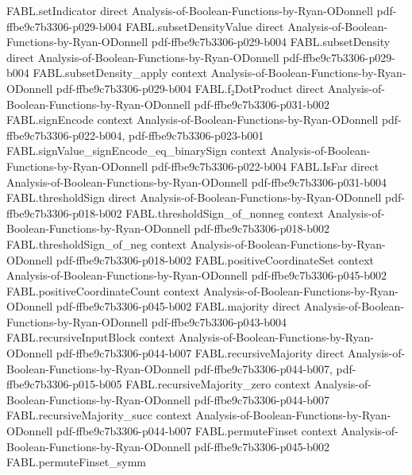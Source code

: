 \begin{theorem}
\proofstep
  {FABL.setIndicator}
  {direct}
  {Analysis-of-Boolean-Functions-by-Ryan-ODonnell}
  {pdf-ffbe9c7b3306-p029-b004}
\proofstep
  {FABL.subsetDensityValue}
  {direct}
  {Analysis-of-Boolean-Functions-by-Ryan-ODonnell}
  {pdf-ffbe9c7b3306-p029-b004}
\proofstep
  {FABL.subsetDensity}
  {direct}
  {Analysis-of-Boolean-Functions-by-Ryan-ODonnell}
  {pdf-ffbe9c7b3306-p029-b004}
\proofstep
  {FABL.subsetDensity_apply}
  {context}
  {Analysis-of-Boolean-Functions-by-Ryan-ODonnell}
  {pdf-ffbe9c7b3306-p029-b004}
\proofstep
  {FABL.f₂DotProduct}
  {direct}
  {Analysis-of-Boolean-Functions-by-Ryan-ODonnell}
  {pdf-ffbe9c7b3306-p031-b002}
\proofstep
  {FABL.signEncode}
  {context}
  {Analysis-of-Boolean-Functions-by-Ryan-ODonnell}
  {pdf-ffbe9c7b3306-p022-b004,
    pdf-ffbe9c7b3306-p023-b001}
\proofstep
  {FABL.signValue_signEncode_eq_binarySign}
  {context}
  {Analysis-of-Boolean-Functions-by-Ryan-ODonnell}
  {pdf-ffbe9c7b3306-p022-b004}
\proofstep
  {FABL.IsFar}
  {direct}
  {Analysis-of-Boolean-Functions-by-Ryan-ODonnell}
  {pdf-ffbe9c7b3306-p031-b004}
\proofstep
  {FABL.thresholdSign}
  {direct}
  {Analysis-of-Boolean-Functions-by-Ryan-ODonnell}
  {pdf-ffbe9c7b3306-p018-b002}
\proofstep
  {FABL.thresholdSign_of_nonneg}
  {context}
  {Analysis-of-Boolean-Functions-by-Ryan-ODonnell}
  {pdf-ffbe9c7b3306-p018-b002}
\proofstep
  {FABL.thresholdSign_of_neg}
  {context}
  {Analysis-of-Boolean-Functions-by-Ryan-ODonnell}
  {pdf-ffbe9c7b3306-p018-b002}
\proofstep
  {FABL.positiveCoordinateSet}
  {context}
  {Analysis-of-Boolean-Functions-by-Ryan-ODonnell}
  {pdf-ffbe9c7b3306-p045-b002}
\proofstep
  {FABL.positiveCoordinateCount}
  {context}
  {Analysis-of-Boolean-Functions-by-Ryan-ODonnell}
  {pdf-ffbe9c7b3306-p045-b002}
\proofstep
  {FABL.majority}
  {direct}
  {Analysis-of-Boolean-Functions-by-Ryan-ODonnell}
  {pdf-ffbe9c7b3306-p043-b004}
\proofstep
  {FABL.recursiveInputBlock}
  {context}
  {Analysis-of-Boolean-Functions-by-Ryan-ODonnell}
  {pdf-ffbe9c7b3306-p044-b007}
\proofstep
  {FABL.recursiveMajority}
  {direct}
  {Analysis-of-Boolean-Functions-by-Ryan-ODonnell}
  {pdf-ffbe9c7b3306-p044-b007,
    pdf-ffbe9c7b3306-p015-b005}
\proofstep
  {FABL.recursiveMajority_zero}
  {context}
  {Analysis-of-Boolean-Functions-by-Ryan-ODonnell}
  {pdf-ffbe9c7b3306-p044-b007}
\proofstep
  {FABL.recursiveMajority_succ}
  {context}
  {Analysis-of-Boolean-Functions-by-Ryan-ODonnell}
  {pdf-ffbe9c7b3306-p044-b007}
\proofstep
  {FABL.permuteFinset}
  {context}
  {Analysis-of-Boolean-Functions-by-Ryan-ODonnell}
  {pdf-ffbe9c7b3306-p045-b002}
\proofstep
  {FABL.permuteFinset_symm}

\end{theorem}
